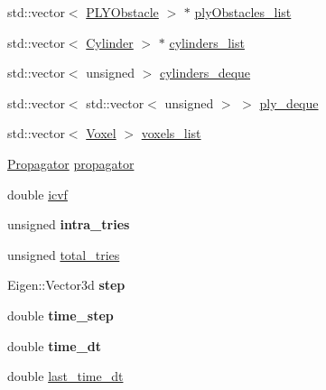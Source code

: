 \begin{DoxyCompactItemize}
\item 
std\+::vector$<$ \hyperlink{class_p_l_y_obstacle}{P\+L\+Y\+Obstacle} $>$ $\ast$ \hyperlink{class_dynamics_simulation_a830b3e0aa0ce95720ea0a8180e2cffec}{ply\+Obstacles\+\_\+list}
\item 
std\+::vector$<$ \hyperlink{class_cylinder}{Cylinder} $>$ $\ast$ \hyperlink{class_dynamics_simulation_a938c4df48ca1cabcadefb974093d4a57}{cylinders\+\_\+list}
\item 
std\+::vector$<$ unsigned $>$ \hyperlink{class_dynamics_simulation_a927a79875ff2f035d929229cf4471756}{cylinders\+\_\+deque}
\item 
std\+::vector$<$ std\+::vector$<$ unsigned $>$ $>$ \hyperlink{class_dynamics_simulation_ad920a07f2c8c85fab7a1aec983c15b20}{ply\+\_\+deque}
\item 
std\+::vector$<$ \hyperlink{class_voxel}{Voxel} $>$ \hyperlink{class_dynamics_simulation_ab68d71822661c3608bde4553392c9bd1}{voxels\+\_\+list}
\item 
\hyperlink{class_propagator}{Propagator} \hyperlink{class_dynamics_simulation_a62f78ae3e723206d16f1528e344ab1e9}{propagator}
\item 
double \hyperlink{class_dynamics_simulation_ac4161cbca21d20fde85817a21b99bd07}{icvf}
\item 
\mbox{\label{class_dynamics_simulation_ab2eef9ff5ee32531cdf743327cf41455}} 
unsigned {\bfseries intra\+\_\+tries}
\item 
unsigned \hyperlink{class_dynamics_simulation_abb056d8cde70aab8b6fa81ee8cdb231e}{total\+\_\+tries}
\item 
\mbox{\label{class_dynamics_simulation_af7ff1563912461e63693087d7aaf616b}} 
Eigen\+::\+Vector3d {\bfseries step}
\item 
\mbox{\label{class_dynamics_simulation_a854c987e8b1806d74205eb916836befa}} 
double {\bfseries time\+\_\+step}
\item 
\mbox{\label{class_dynamics_simulation_ae79118cbf5ce497cc82c6471353d5045}} 
double {\bfseries time\+\_\+dt}
\item 
double \hyperlink{class_dynamics_simulation_aa73be02bc4cb5027a1bc4a0b6b91b4b2}{last\+\_\+time\+\_\+dt}
\item 
\mbox{\label{class_dynamics_simulation_a5d736b0d739d22d6a2d9371fbcdd8775}} 

\end{DoxyCompactItemize}
